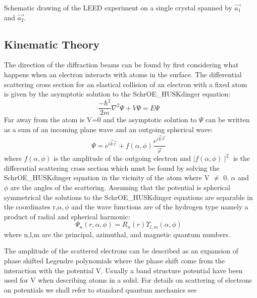 \vspace*{11cm}

 Schematic drawing of the LEED experiment on a single crystal spanned by $\overrightarrow{a_1}$ and $\overrightarrow{a_2}$.
\vspace{1cm}

\subsection{Kinematic Theory}

The direction of the diffraction beams can be found by first considering what happens when an electron interacts with  atoms in the surface. The differential scattering cross section for an elastical collision of an electron with a fixed atom is given by the asymptotic solution to the SchrOE_HUSKdinger equation:
\begin{equation}
\frac{-\hbar^2}{2m}\nabla^2 \Psi + V \Psi = E \Psi
\end{equation}
Far away from the atom is V=0 and the asymptotic solution to $\Psi$ can be written as a sum of an incoming plane wave and an outgoing spherical wave:
\begin{equation}
\Psi= e^{i\overrightarrow{k} \overrightarrow{r}} + f(\alpha,\phi) \frac{e^{i\overrightarrow{k} \overrightarrow{r}}}{\overrightarrow{r}}
\end{equation}
where $f(\alpha,\phi)$ is the amplitude of the outgoing electron and $\mid f(\alpha,\phi) \mid^2$ is the differential scattering cross section which must be found by solving the SchrOE_HUSKdinger equation in the vicinity of the atom where V $\neq$ 0. $\alpha $ and $\phi$ are the angles of the scattering. Assuming that the potential is spherical symmetrical the solutions to the SchrOE_HUSKdinger equations are separable in the coordinates r,$\alpha, \phi$ and the wave functions are of the hydrogen type namely a product of radial and spherical harmonic:
\begin{equation}
\Psi_n(r,\alpha,\phi) = R_n(r) \Upsilon_{l,m}(\alpha,\phi) 
\end{equation}
where n,l,m are the principal, azimuthal, and magnetic quantum numbers.

The amplitude of the scattered electrons can  be described as an expansion of phase shifted Legendre polynomials where the phase shift come from the interaction with the potential V. Usually a band structure potential have been used for V when describing atoms in a solid. For details on scattering of electrons on potentials we shall refer to standard quantum mechanics see \cite{Shiff, Merzbacher}


